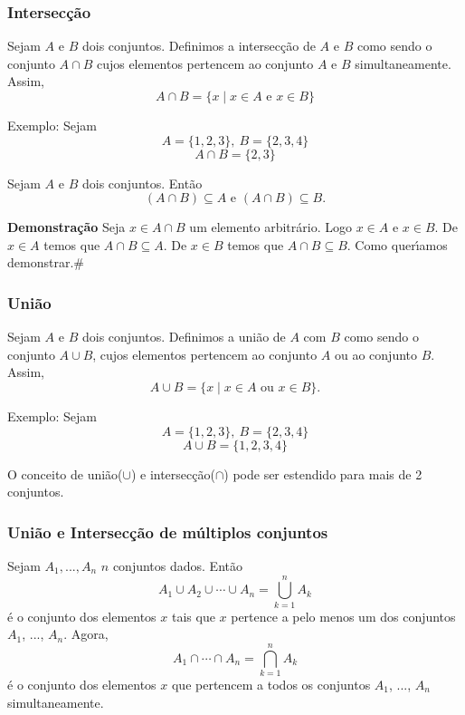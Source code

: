 \subsubsection{Intersec{\c c}{\~a}o}

\begin{definicao}[Intersec{\c c}{\~a}o] Sejam $A$ e $B$ dois conjuntos. Definimos a intersec{\c c}{\~a}o de $A$ e $B$ como sendo o conjunto $A \cap B$ cujos elementos pertencem ao conjunto $A$ e $B$ simultaneamente. Assim,
\[ A \cap B = \{x \mid x \in A\mbox{ e }  x \in B\}\]
\end{definicao}

Exemplo: Sejam
\[ A = \{1,2,3\},\ B = \{2,3,4\}\]
\[A \cap B = \{2,3\}\]

\begin{proposicao} Sejam $A$ e $B$ dois conjuntos. Ent{\~a}o
\[(A \cap B) \subseteq A  \mbox{ e } (A \cap B) \subseteq B.\]
\end{proposicao}

\textbf{Demonstra{\c c}{\~a}o} Seja $x \in A \cap B$ um elemento arbitr{\'a}rio. Logo $x \in A$ e $x \in B$. De $x \in A$ temos que $A \cap B \subseteq A$. De $x \in B$ temos que $A \cap B \subseteq B$. Como quer{\'\i}amos demonstrar.\#

\subsubsection{Uni{\~a}o}

\begin{definicao}[Uni{\~a}o] Sejam $A$ e $B$ dois conjuntos. Definimos a uni{\~a}o de $A$ com $B$ como sendo o conjunto $A \cup B$, cujos elementos pertencem ao conjunto $A$ ou ao conjunto $B$. Assim,
\[A \cup B = \{x \mid x \in A \mbox{ ou } x \in B\}.\]
\end{definicao}

Exemplo: Sejam
\[A = \{1,2,3\},\ B = \{2,3,4\}\]
\[A \cup B = \{1,2,3,4\}\]

O conceito de uni{\~a}o($ \cup $) e intersec{\c c}{\~a}o($ \cap $) pode ser estendido para mais de 2 conjuntos.

\subsubsection{Uni{\~a}o e Intersec{\c c}{\~a}o de m{\'u}ltiplos conjuntos}
\begin{definicao} Sejam $A_{1},...,A_{n}$ $n$ conjuntos dados. Ent{\~a}o
\[A_{1} \cup A_{2} \cup \cdots \cup A_{n}= \displaystyle\bigcup_{k=1}^{n} A_{k}\]
{\'e} o conjunto dos elementos $x$ tais que $x$ pertence a pelo menos um dos conjuntos $A_{1}$, ..., $A_{n}$. Agora,
\[A_{1} \cap \cdots \cap A_{n} = \displaystyle\bigcap_{k=1}^{n}A_{k}\]
{\'e} o conjunto dos elementos $x$ que pertencem a todos os conjuntos $A_{1}$, ..., $A_{n}$ simultaneamente.
\end{definicao}

